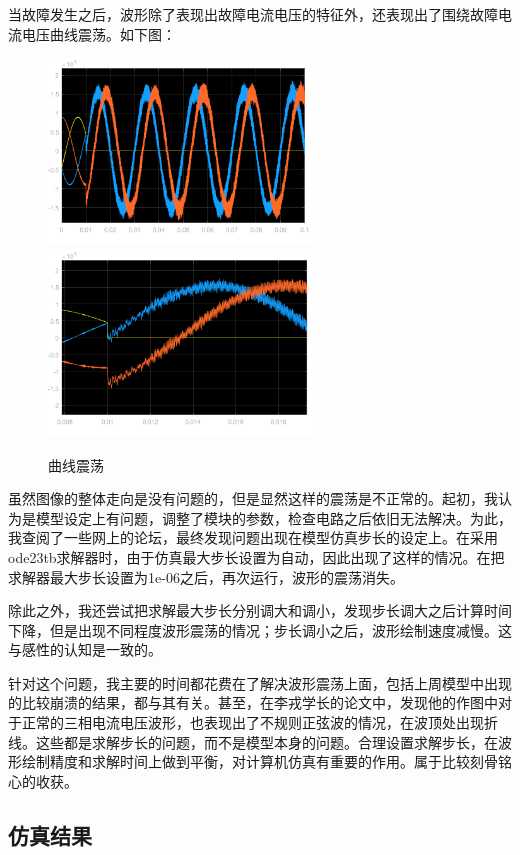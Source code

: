 \documentclass{article}
\begin{document}
{	当故障发生之后，波形除了表现出故障电流电压的特征外，还表现出了围绕故障电流电压曲线震荡。如下图：
	
	\begin{figure}[htpb]
		\centering
		\includegraphics[width=7cm]{figure/2.png}
		\includegraphics[width=7cm]{figure/3.png}
		\caption{曲线震荡}
	\end{figure}

	虽然图像的整体走向是没有问题的，但是显然这样的震荡是不正常的。起初，我认为是模型设定上有问题，调整了模块的参数，检查电路之后依旧无法解决。为此，我查阅了一些网上的论坛，最终发现问题出现在模型仿真步长的设定上。在采用ode23tb求解器时，由于仿真最大步长设置为自动，因此出现了这样的情况。在把求解器最大步长设置为1e-06之后，再次运行，波形的震荡消失。
	
	除此之外，我还尝试把求解最大步长分别调大和调小，发现步长调大之后计算时间下降，但是出现不同程度波形震荡的情况；步长调小之后，波形绘制速度减慢。这与感性的认知是一致的。
	
	针对这个问题，我主要的时间都花费在了解决波形震荡上面，包括上周模型中出现的比较崩溃的结果，都与其有关。甚至，在李戎学长的论文中，发现他的作图中对于正常的三相电流电压波形，也表现出了不规则正弦波的情况，在波顶处出现折线。这些都是求解步长的问题，而不是模型本身的问题。合理设置求解步长，在波形绘制精度和求解时间上做到平衡，对计算机仿真有重要的作用。属于比较刻骨铭心的收获。
	
	\subsection{仿真结果}
	
}
\end{document}
